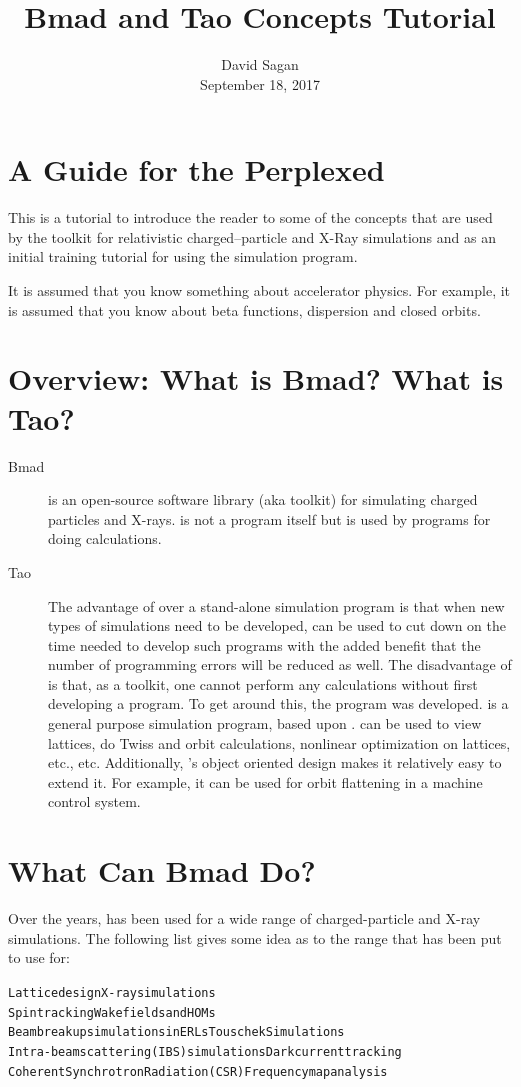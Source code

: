 \documentclass{hitec}
\title{Bmad and Tao Concepts Tutorial}
\author{}
\date{David Sagan \\ September 18, 2017}
\newcommand{\Section}[1]{\section{#1}\vspace*{-1ex}}
\newenvironment{display}
  {\vspace*{-1.5ex} \begin{alltt}}
  {\end{alltt} \vspace*{-1.0ex}}
\begin{document}
\maketitle

\tableofcontents

\Section{A Guide for the Perplexed}
\label{s:guide}

This is a tutorial to introduce the reader to some of the concepts that are used by the \bmad toolkit
for relativistic charged--particle and X-Ray simulations and as an initial training tutorial
for using the \tao simulation program.

It is assumed that you know something about accelerator physics. For example, it is assumed that
you know about beta functions, dispersion and closed orbits.

\Section{Overview: What is Bmad? What is Tao?}
\label{s:overview}

  \begin{description}
  \item[Bmad] \Newline
\bmad is an open-source software library (aka toolkit) for simulating charged particles
and X-rays. \bmad is not a program itself but is used by programs for doing
calculations. 
  \item[Tao] \Newline
The advantage of \bmad over a stand-alone simulation program is that when new types of simulations
need to be developed, \bmad can be used to cut down on the time needed to develop such programs
with the added benefit that the number of programming errors will be reduced
as well. The disadvantage of \bmad is that, as a toolkit, one cannot perform any calculations
without first developing a program. To get around this, the \tao program was developed.
\tao is a general purpose simulation program, based upon \bmad. \tao can be used to view
lattices, do Twiss and orbit calculations, nonlinear optimization on lattices, etc., etc.
Additionally, \tao's object oriented design makes it relatively easy to extend it. For
example, it can be used for orbit flattening in a machine control system.
  \end{description}

\Section{What Can Bmad Do?}

Over the years, \bmad has been used for a wide range of charged-particle and X-ray
simulations. The following list gives some idea as to the range that \bmad has been put to use
for:
\begin{display}
  Lattice design                              X-ray simulations
  Spin tracking                               Wakefields and HOMs
  Beam breakup simulations in ERLs            Touschek Simulations
  Intra-beam scattering (IBS) simulations     Dark current tracking
  Coherent Synchrotron Radiation (CSR)        Frequency map analysis
\end{display}
\end{document}
